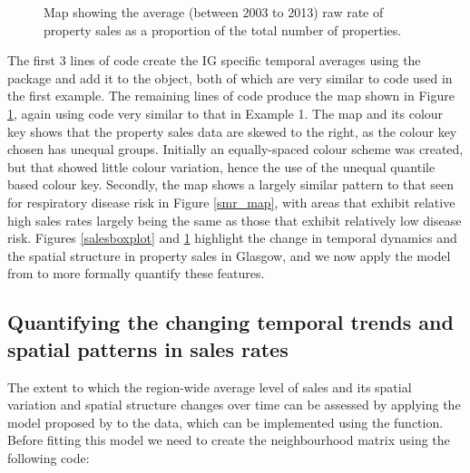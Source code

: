 \documentclass[article, nojss]{jss}
\begin{document}
\begin{figure}
\centering 
{}
\caption{Map showing the average (between 2003 to 2013) raw rate of property sales as a proportion of the total number of properties.\label{salesmap}}
\end{figure} 


The first 3 lines of code create the IG specific temporal averages using the  package and add it to the   object, both of which are very similar to code used in the first example. The remaining lines of code produce the map shown in Figure \ref{salesmap}, again using code very similar to that in Example 1. The map and its colour key shows that the property sales data are skewed to the right, as the colour key chosen has unequal groups. Initially an equally-spaced colour scheme was created, but that showed little colour variation, hence the use of the unequal quantile based colour key. Secondly, the map shows a largely similar pattern to that seen for respiratory disease risk in Figure \ref{smr_map}, with areas that exhibit relative high sales rates largely being the same as those that exhibit relatively low disease risk. Figures \ref{salesboxplot} and \ref{salesmap} highlight the change in temporal dynamics and the spatial structure in property sales in Glasgow, and we now apply the  model from  to more formally quantify these features.

\subsection{Quantifying the changing temporal trends and spatial patterns in sales rates}
The extent to which the region-wide average level of sales and its spatial variation and spatial structure changes over time can be assessed by applying the model proposed by \cite{napier2016} to the data, which can be implemented using the  function. Before fitting this model we need to create the neighbourhood matrix using the following code:
\end{document}
